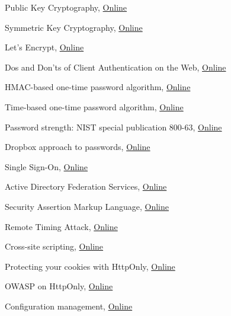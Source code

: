 \documentclass[a4paper,12pt,oneside,openright]{memoir}
\begin{document}
%
%
\begin{thebibliography}{5}

 Public Key Cryptography,
\href{http://en.wikipedia.org/wiki/Public-key_cryptography}{Online}

 Symmetric Key Cryptography,
\href{http://en.wikipedia.org/wiki/Symmetric-key_algorithm}{Online}

 Let's Encrypt,
\href{https://letsencrypt.org}{Online}

 Dos and Don'ts of Client Authentication on the Web,
\href{https://pdos.csail.mit.edu/papers/webauth:sec10.pdf}{Online}

 HMAC-based one-time password algorithm,
\href{https://en.wikipedia.org/wiki/HMAC-based_One-time_Password_algorithm}{Online}

 Time-based one-time password algorithm,
\href{https://en.wikipedia.org/wiki/Time-based_One-time_Password_algorithm}{Online}

 Password strength: NIST special publication 800-63,
\href{http://en.wikipedia.org/wiki/Password_strength#NIST_Special_Publication_800-63}{Online}

 Dropbox approach to passwords,
\href{https://blogs.dropbox.com/tech/2012/04/zxcvbn-realistic-password-strength-estimation}{Online}

 Single Sign-On,
\href{https://en.wikipedia.org/wiki/Single_sign-on}{Online}

 Active Directory Federation Services,
\href{https://en.wikipedia.org/wiki/Active_Directory_Federation_Services}{Online}

 Security Assertion Markup Language,
\href{https://en.wikipedia.org/wiki/Security_Assertion_Markup_Language}{Online}

 Remote Timing Attack,
\href{http://en.wikipedia.org/wiki/Timing_attack}{Online}

 Cross-site scripting,
\href{http://en.wikipedia.org/wiki/Cross-site_scripting}{Online}

 Protecting your cookies with HttpOnly,
\href{http://blog.codinghorror.com/protecting-your-cookies-httponly/}{Online}

 OWASP on HttpOnly,
\href{https://www.owasp.org/index.php/HttpOnly}{Online}

 Configuration management,
\href{https://en.wikipedia.org/wiki/Configuration_management}{Online}


\end{thebibliography}
%
\end{document}
